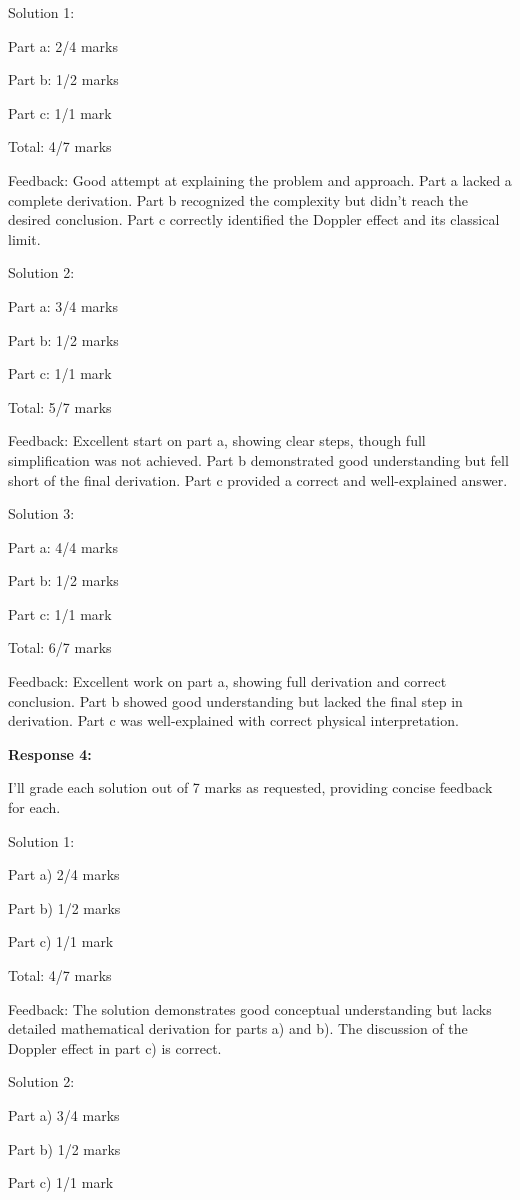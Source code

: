 \documentclass[a4paper,11pt]{article}
\begin{document}
Solution 1:

Part a: 2/4 marks

Part b: 1/2 marks

Part c: 1/1 mark

Total: 4/7 marks

Feedback: Good attempt at explaining the problem and approach. Part a lacked a complete derivation. Part b recognized the complexity but didn't reach the desired conclusion. Part c correctly identified the Doppler effect and its classical limit.

Solution 2:

Part a: 3/4 marks

Part b: 1/2 marks

Part c: 1/1 mark

Total: 5/7 marks

Feedback: Excellent start on part a, showing clear steps, though full simplification was not achieved. Part b demonstrated good understanding but fell short of the final derivation. Part c provided a correct and well-explained answer.

Solution 3:

Part a: 4/4 marks

Part b: 1/2 marks

Part c: 1/1 mark

Total: 6/7 marks

Feedback: Excellent work on part a, showing full derivation and correct conclusion. Part b showed good understanding but lacked the final step in derivation. Part c was well-explained with correct physical interpretation.

\bigskip
\textbf{Response 4:}

I'll grade each solution out of 7 marks as requested, providing concise feedback for each.

Solution 1:

Part a) 2/4 marks

Part b) 1/2 marks

Part c) 1/1 mark

Total: 4/7 marks

Feedback: The solution demonstrates good conceptual understanding but lacks detailed mathematical derivation for parts a) and b). The discussion of the Doppler effect in part c) is correct.

Solution 2:

Part a) 3/4 marks

Part b) 1/2 marks

Part c) 1/1 mark
\end{document}
